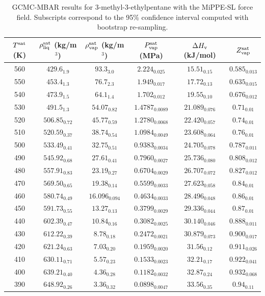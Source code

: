 \documentclass[journal=jctc,manuscript=article]{achemso}
\begin{document}
\begin{table}[htb!]
	\caption{GCMC-MBAR results for 3-methyl-3-ethylpentane with the MiPPE-SL force field. Subscripts correspond to the 95\% confidence interval computed with bootstrap re-sampling.}
	\begin{center}
		\begin{tabular}{|c|c|c|c|c|c|}
			\hline
			$T^{\rm sat}$ (K) & $\rho_{\rm liq}^{\rm sat}$ (kg/m$^3$) & $\rho_{\rm vap}^{\rm sat}$ (kg/m$^3$) & $P_{\rm vap}^{\rm sat}$ (MPa) & $\Delta H_{\rm v}$ (kJ/mol) & $Z_{\rm vap}^{\rm sat}$ \\ \hline
			560 & $429.6_{1.9}$ & $93.3_{3.0}$ & $2.224_{0.025}$ & $15.51_{0.15}$ & $0.585_{0.013}$ \\
			550 & $453.4_{1.3}$ & $76.7_{2.3}$ & $1.949_{0.017}$ & $17.72_{0.13}$ & $0.635_{0.015}$ \\
			540 & $473.9_{1.5}$ & $64.1_{1.4}$ & $1.702_{0.012}$ & $19.55_{0.10}$ & $0.676_{0.012}$ \\
			530 & $491.5_{1.3}$ & $54.07_{0.82}$ & $1.4787_{0.0089}$ & $21.089_{0.076}$ & $0.71_{0.01}$ \\
			520 & $506.85_{0.72}$ & $45.77_{0.59}$ & $1.2780_{0.0068}$ & $22.420_{0.057}$ & $0.74_{0.01}$ \\
			510 & $520.59_{0.37}$ & $38.74_{0.54}$ & $1.0984_{0.0049}$ & $23.608_{0.064}$ & $0.76_{0.01}$ \\
			500 & $533.49_{0.41}$ & $32.75_{0.51}$ & $0.9383_{0.0034}$ & $24.705_{0.078}$ & $0.787_{0.011}$ \\
			490 & $545.92_{0.68}$ & $27.61_{0.41}$ & $0.7960_{0.0027}$ & $25.736_{0.080}$ & $0.808_{0.012}$ \\
			480 & $557.91_{0.83}$ & $23.19_{0.27}$ & $0.6704_{0.0029}$ & $26.707_{0.072}$ & $0.827_{0.012}$ \\
			470 & $569.50_{0.65}$ & $19.38_{0.14}$ & $0.5599_{0.0033}$ & $27.623_{0.058}$ & $0.84_{0.01}$ \\
			460 & $580.74_{0.49}$ & $16.096_{0.094}$ & $0.4634_{0.0033}$ & $28.496_{0.048}$ & $0.86_{0.01}$ \\
			450 & $591.73_{0.55}$ & $13.27_{0.13}$ & $0.3799_{0.0029}$ & $29.336_{0.044}$ & $0.87_{0.01}$ \\
			440 & $602.39_{0.47}$ & $10.84_{0.16}$ & $0.3082_{0.0025}$ & $30.140_{0.046}$ & $0.888_{0.011}$ \\
			430 & $612.22_{0.39}$ & $8.78_{0.18}$ & $0.2472_{0.0021}$ & $30.879_{0.073}$ & $0.900_{0.017}$ \\
			420 & $621.24_{0.63}$ & $7.03_{0.20}$ & $0.1959_{0.0020}$ & $31.56_{0.12}$ & $0.911_{0.026}$ \\
			410 & $630.11_{0.71}$ & $5.57_{0.23}$ & $0.1533_{0.0023}$ & $32.21_{0.17}$ & $0.922_{0.041}$ \\
			400 & $639.21_{0.40}$ & $4.36_{0.28}$ & $0.1182_{0.0032}$ & $32.87_{0.24}$ & $0.932_{0.068}$ \\
			390 & $648.92_{0.26}$ & $3.36_{0.32}$ & $0.0898_{0.0047}$ & $33.56_{0.35}$ & $0.94_{0.11}$ \\
			\hline
		\end{tabular}
	\end{center}
\end{table}
\end{document}
